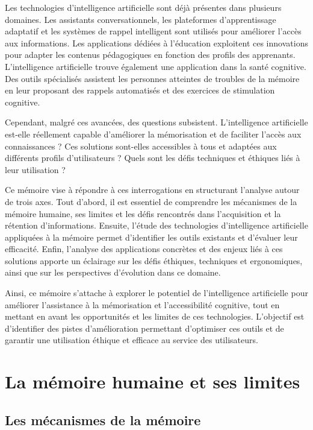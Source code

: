 \documentclass[12pt,a4paper]{report}
\begin{document}
Les technologies d'intelligence artificielle sont déjà présentes dans plusieurs domaines. Les assistants conversationnels, les plateformes d'apprentissage adaptatif et les systèmes de rappel intelligent sont utilisés pour améliorer l'accès aux informations. Les applications dédiées à l'éducation exploitent ces innovations pour adapter les contenus pédagogiques en fonction des profils des apprenants. L'intelligence artificielle trouve également une application dans la santé cognitive. Des outils spécialisés assistent les personnes atteintes de troubles de la mémoire en leur proposant des rappels automatisés et des exercices de stimulation cognitive.

Cependant, malgré ces avancées, des questions subsistent. L'intelligence artificielle est-elle réellement capable d'améliorer la mémorisation et de faciliter l'accès aux connaissances ? Ces solutions sont-elles accessibles à tous et adaptées aux différents profils d'utilisateurs ? Quels sont les défis techniques et éthiques liés à leur utilisation ?

\newpage
Ce mémoire vise à répondre à ces interrogations en structurant l'analyse autour de trois axes. Tout d'abord, il est essentiel de comprendre les mécanismes de la mémoire humaine, ses limites et les défis rencontrés dans l'acquisition et la rétention d'informations. Ensuite, l'étude des technologies d'intelligence artificielle appliquées à la mémoire permet d'identifier les outils existants et d'évaluer leur efficacité. Enfin, l'analyse des applications concrètes et des enjeux liés à ces solutions apporte un éclairage sur les défis éthiques, techniques et ergonomiques, ainsi que sur les perspectives d'évolution dans ce domaine.

Ainsi, ce mémoire s'attache à explorer le potentiel de l'intelligence artificielle pour améliorer l'assistance à la mémorisation et l'accessibilité cognitive, tout en mettant en avant les opportunités et les limites de ces technologies. L'objectif est d'identifier des pistes d'amélioration permettant d'optimiser ces outils et de garantir une utilisation éthique et efficace au service des utilisateurs.

\chapter{La mémoire humaine et ses limites}

\section{Les mécanismes de la mémoire}
\end{document}
